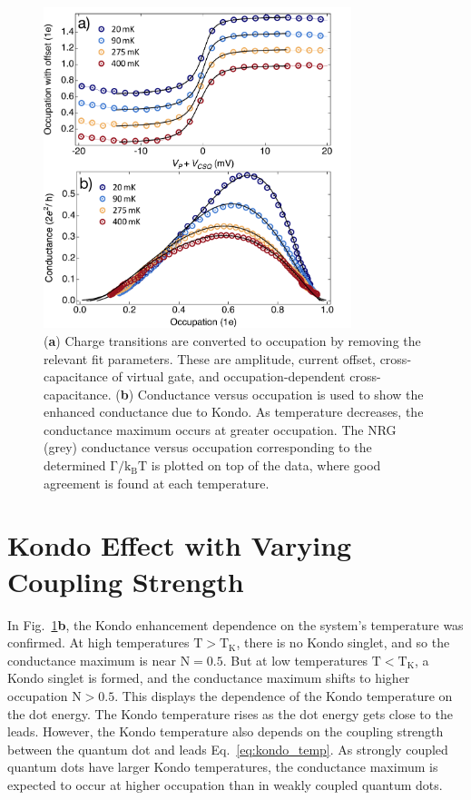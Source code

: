 \begin{figure}[!bht]
 \begin{center}
 \includegraphics[width=0.8\textwidth]{figures/ch3/figure14.pdf}
 \caption[Conductance versus Occupation : Varying Temperature]{\label{fig:ch3/cond_vs_occ_gf} 
 (\textbf{a}) Charge transitions are converted to occupation by removing the relevant fit parameters. These are amplitude, current offset, cross-capacitance of virtual gate, and occupation-dependent cross-capacitance. (\textbf{b}) Conductance versus occupation is used to show the enhanced conductance due to Kondo. As temperature decreases, the conductance maximum occurs at greater occupation. The NRG (grey) conductance versus occupation corresponding to the determined $\mathrm{\Gamma/k_BT}$ is plotted on top of the data, where good agreement is found at each temperature.}
 \end{center}
\end{figure}


\section{Kondo Effect with Varying Coupling Strength}


In Fig.~\ref{fig:ch3/cond_vs_occ_gf}\textbf{b}, the Kondo enhancement dependence on the system's temperature was confirmed. At high temperatures $\mathrm{T>T_K}$, there is no Kondo singlet, and so the conductance maximum is near $\mathrm{N} = 0.5$. But at low temperatures $\mathrm{T<T_K}$, a Kondo singlet is formed, and the conductance maximum shifts to higher occupation $\mathrm{N} > 0.5$. This displays the dependence of the Kondo temperature on the dot energy. The Kondo temperature rises as the dot energy gets close to the leads. However, the Kondo temperature also depends on the coupling strength between the quantum dot and leads Eq.~\ref{eq:kondo_temp}. As strongly coupled quantum dots have larger Kondo temperatures, the conductance maximum is expected to occur at higher occupation than in weakly coupled quantum dots. 


